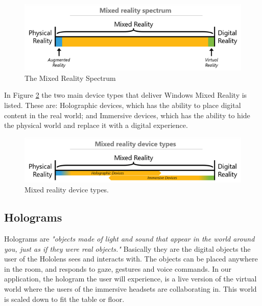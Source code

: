             \begin{figure}[!ht]
                \centering
                \includegraphics[scale=.85]{figures/mixedrealityspectrum.png}
                \caption{The Mixed Reality Spectrum\cite{wdc-mr}}
                \label{fig:mrspectrum}
            \end{figure}
            
            In Figure \ref{fig:mrdevicetypes} the two main device types that deliver Windows Mixed Reality is listed. These are: Holographic devices, which has the ability to place digital content in the real world\cite{wdc-mr}; and Immersive devices, which has the ability to hide the physical world and replace it with a digital experience.\cite{wdc-mr} 
            
            \begin{figure}[!ht]
                \centering
                \includegraphics[scale=.85]{figures/mixedrealityspectrumdevicetypes.png}
                \caption{Mixed reality device types.\cite{wdc-mr}}
                \label{fig:mrdevicetypes}
            \end{figure}
            
        \subsection{Holograms}
            Holograms are \emph{"objects made of light and sound that appear in the world around you, just as if they were real objects."} \cite{wdc-holo} Basically they are the digital objects the user of the Hololens sees and interacts with. The objects can be placed anywhere in the room, and responds to gaze, gestures and voice commands. In our application, the hologram the user will experience, is a live version of the virtual world where the users of the immersive headsets are collaborating in. This world is scaled down to fit the table or floor.
            
